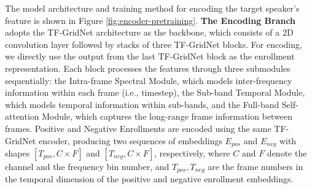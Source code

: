 The model architecture and training method for encoding the target speaker's feature is shown in Figure \ref{fig:encoder-pretraining}. \textbf{The Encoding Branch} adopts the TF-GridNet architecture as the backbone, which consists of a 2D convolution layer followed by stacks of three TF-GridNet blocks. For encoding, we directly use the output from the last TF-GridNet block as the enrollment representation. Each block processes the features through three submodules sequentially: the Intra-frame Spectral Module, which models inter-frequency information within each frame (i.e., timestep), the Sub-band Temporal Module, which models temporal information within sub-bands, and the Full-band Self-attention Module, which captures the long-range frame information between frames. 
Positive and Negative Enrollments are encoded using the same TF-GridNet encoder, producing two sequences of embeddings $E_{pos}$ and $E_{neg}$ with shapes $[T_{pos}, C \times F]$ and $[T_{neg}, C \times F]$, respectively, where $C$ and $F$ denote the channel and the frequency bin number, and $T_{pos}, T_{neg}$ are the frame numbers in the temporal dimension of the positive and negative enrollment embeddings. 


